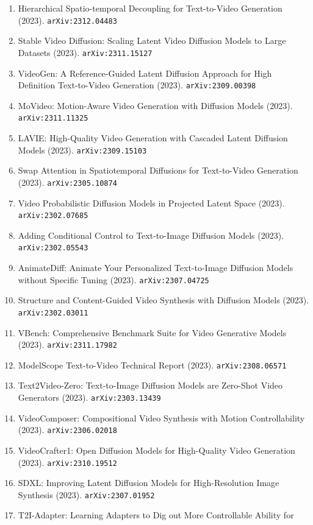 \documentclass[11pt]{article}
\begin{document}
\begin{enumerate}
  Diffusion Models (2023). \texttt{arXiv:2304.08818}
  \item Hierarchical Spatio-temporal Decoupling for Text-to-Video Generation (2023). \texttt{arXiv:2312.04483}
  \item Stable Video Diffusion: Scaling Latent Video Diffusion Models to Large
  Datasets (2023). \texttt{arXiv:2311.15127}
  \item VideoGen: A Reference-Guided Latent Diffusion Approach for High
  Definition Text-to-Video Generation (2023). \texttt{arXiv:2309.00398}
  \item MoVideo: Motion-Aware Video Generation with Diffusion Models (2023). \texttt{arXiv:2311.11325}
  \item LAVIE: High-Quality Video Generation with Cascaded Latent Diffusion
  Models (2023). \texttt{arXiv:2309.15103}
  \item Swap Attention in Spatiotemporal Diffusions for Text-to-Video Generation (2023). \texttt{arXiv:2305.10874}
  \item Video Probabilistic Diffusion Models in Projected Latent Space (2023). \texttt{arXiv:2302.07685}
  \item Adding Conditional Control to Text-to-Image Diffusion Models (2023). \texttt{arXiv:2302.05543}
  \item AnimateDiff: Animate Your Personalized Text-to-Image Diffusion Models
  without Specific Tuning (2023). \texttt{arXiv:2307.04725}
  \item Structure and Content-Guided Video Synthesis with Diffusion Models (2023). \texttt{arXiv:2302.03011}
  \item VBench: Comprehensive Benchmark Suite for Video Generative Models (2023). \texttt{arXiv:2311.17982}
  \item ModelScope Text-to-Video Technical Report (2023). \texttt{arXiv:2308.06571}
  \item Text2Video-Zero: Text-to-Image Diffusion Models are Zero-Shot Video
  Generators (2023). \texttt{arXiv:2303.13439}
  \item VideoComposer: Compositional Video Synthesis with Motion Controllability (2023). \texttt{arXiv:2306.02018}
  \item VideoCrafter1: Open Diffusion Models for High-Quality Video Generation (2023). \texttt{arXiv:2310.19512}
  \item SDXL: Improving Latent Diffusion Models for High-Resolution Image
  Synthesis (2023). \texttt{arXiv:2307.01952}
  \item T2I-Adapter: Learning Adapters to Dig out More Controllable Ability for

\end{enumerate}
\end{document}
